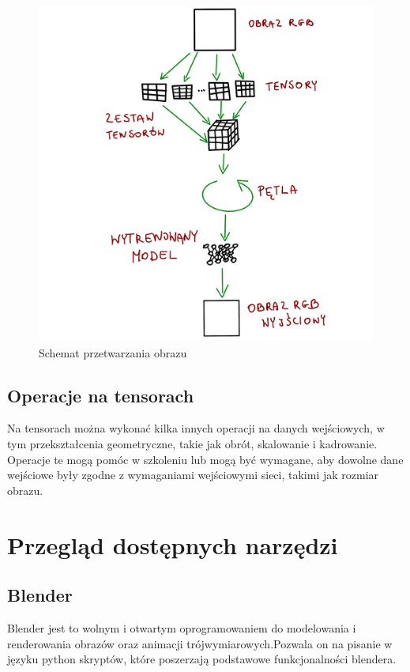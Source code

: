 \documentclass[brudnopis]{xmgr}
\begin{document}
 \begin{figure}[!tbh]
\centering
\includegraphics[width=.8\hsize]{fig/5}
\caption{Schemat przetwarzania obrazu\label{RYS.5}}
\end{figure}
 


 \section{Operacje na tensorach\label{s:dsssl}}
Na tensorach można  wykonać kilka innych operacji na danych wejściowych, w tym przekształcenia geometryczne, takie jak obrót, skalowanie i kadrowanie. Operacje te mogą pomóc w szkoleniu lub mogą być wymagane, aby dowolne dane wejściowe były zgodne z wymaganiami wejściowymi sieci, takimi jak rozmiar obrazu.


\chapter{Przegląd dostępnych narzędzi}

\section{Blender\label{s:dsssl}}

Blender jest to wolnym i otwartym oprogramowaniem do modelowania i renderowania obrazów oraz animacji trójwymiarowych.Pozwala on na pisanie w języku python skryptów, które poszerzają podstawowe funkcjonalności blendera.
\end{document}
